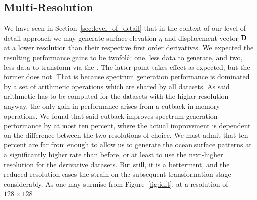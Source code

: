 

%
%
\subsection{Multi-Resolution}
We have seen in Section~\ref{sec:level_of_detail} that in the context of our
level-of-detail approach we may generate surface elevation $\eta$ and
displacement vector $\mathbf{D}$ at a lower resolution than their respective
first order derivatives. We expected the resulting performance gains to be twofold: one,
less data to generate, and two, less data to transform via the \IDFT.
The latter point takes effect as expected, but the former does not.
That is because spectrum generation performance is dominated by a set of
arithmetic operations which are shared by all datasets. As said
arithmetic has to be computed for the datasets with the higher resolution
anyway, the only gain in performance arises from a cutback in memory operations.
We found that said cutback improves spectrum generation performance by at most
ten percent, where the actual improvement is dependent on the difference between
the two resolutions of choice. We must admit that ten percent are far from
enough to allow us to generate the ocean surface patterns at a significantly
higher rate than before, or at least to use the next-higher resolution for the
derivative datasets. But still, it is a betterment, and the reduced resolution
eases the strain on the subsequent transformation stage considerably.
As one may surmise from Figure~\ref{fig:idft}, at a resolution of $128\times128$
